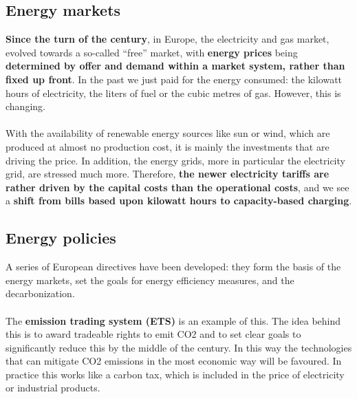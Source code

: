 \documentclass[../summary.tex]{subfiles}
\begin{document}
	\subsection{Energy markets}
	
	\textbf{ Since the turn of the century}, in Europe, the electricity and gas market, evolved towards a so-called “free” market, with \textbf{energy prices} being\textbf{ determined by offer and demand within a market system, rather than fixed up front}. In the past we just paid for the energy consumed: the kilowatt hours of electricity, the liters of fuel or the cubic metres of gas. However, this is changing.
	\\\\
	With the availability of renewable energy sources like sun or wind, which are produced at almost no production cost, it is mainly the investments that are driving the price. In addition, the energy grids, more in particular the electricity grid, are stressed much more. Therefore, \textbf{the newer electricity tariffs are rather driven by the capital costs than the operational costs}, and we see a \textbf{shift from bills based upon kilowatt hours to capacity-based charging}. 
	
	\subsection{Energy policies}
	
	A series of European directives have been developed: they form the basis of the energy markets, set the goals for energy efficiency measures, and the decarbonization. 
	\\\\
	The \textbf{emission trading system (ETS)} is an example of this. The idea behind this is to award tradeable rights to emit CO2 and to set clear goals to significantly reduce this by the middle of the century. In this way the technologies that can mitigate CO2 emissions in the most economic way will be favoured. In practice this works like a carbon tax, which is included in the price of electricity or industrial products.
	
\end{document}
